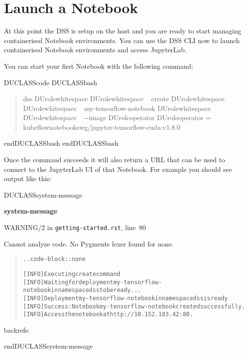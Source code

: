 \documentclass[a4paper]{article}
\newenvironment{DUclass}[1]%
  {%
   \def\DocutilsClassFunctionName{DUCLASS#1}
     \csname \DocutilsClassFunctionName \endcsname}%
  {\csname end\DocutilsClassFunctionName \endcsname}%
\newenvironment{DUadmonition}%
  {\begin{center}
     \begin{lrbox}{\DUadmonitionbox}
       \begin{minipage}{0.9\linewidth}
  }%
  {    \end{minipage}
     \end{lrbox}
     \fbox{\usebox{\DUadmonitionbox}}
   \end{center}
  }
\providecommand*{\DUrole}[2]{%
  \ifcsname DUrole#1\endcsname%
    \csname DUrole#1\endcsname{#2}%
  \else%
    #2%
  \fi%
}
\providecommand*{\DUtitle}[1]{%
  \smallskip\noindent\textbf{#1}\smallskip}
\begin{document}
\section{Launch a Notebook%
  \label{launch-a-notebook}%
}

At this point the DSS is setup on the host and you are ready to start
managing containerised Notebook environments. You can use the DSS CLI
now to launch containerised Notebook environments and access JupyterLab.

You can start your first Notebook with the following command:

\begin{DUclass}{code}
\begin{DUclass}{bash}
\begin{quote}
\ttfamily\raggedright
dss\DUrole{whitespace}{~}create\DUrole{whitespace}{~}my-tensorflow-notebook\DUrole{whitespace}{~}-{}-image\DUrole{operator}{=}kubeflownotebookswg/jupyter-tensorflow-cuda:v1.8.0
\end{quote}
\end{DUclass}
\end{DUclass}

Once the command succeeds it will also return a URL that can be used
to connect to the JupyterLab UI of that Notebook.
For example you should see output like this:

\begin{DUclass}{system-message}
\begin{DUadmonition}
\DUtitle{system-message
}

{\color{red}WARNING/2} in \texttt{getting-started.rst}, line~80

Cannot analyze code. No Pygments lexer found for \textquotedbl{}none\textquotedbl{}.

\begin{quote}
\begin{alltt}
.. code-block:: none

   [INFO] Executing create command
   [INFO] Waiting for deployment my-tensorflow-notebook in namespace dss to be ready...
   [INFO] Deployment my-tensorflow-notebook in namespace dss is ready
   [INFO] Success: Notebook my-tensorflow-notebook created successfully.
   [INFO] Access the notebook at http://10.152.183.42:80.

\end{alltt}
\end{quote}
backrefs: \end{DUadmonition}
\end{DUclass}
\end{document}
